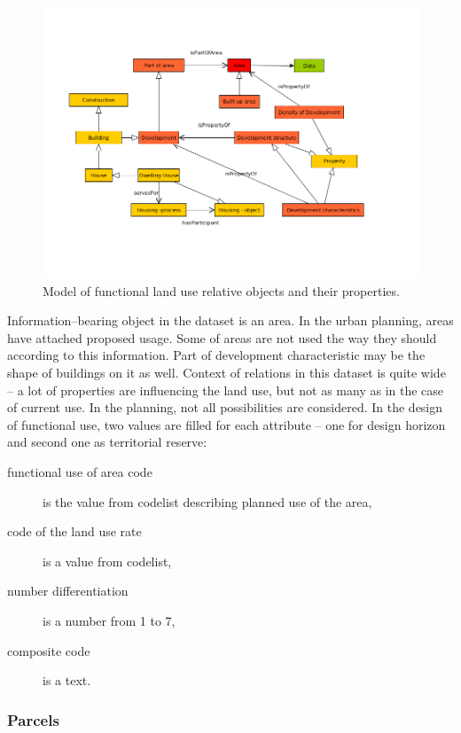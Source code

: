 \documentclass{lncs-template/llncs}
\begin{document}
\begin{figure}
 \includegraphics[width=1.0\textwidth]{images/FVU.png}
 \caption{Model of functional land use relative objects and their properties.}\label{fig:dat_fua}
\end{figure}

Information--bearing object in the dataset is an area. In the urban planning, areas have attached proposed usage. Some of areas are not used the way they should according to this information. Part of development characteristic may be the shape of buildings on it as well. Context of relations in this dataset is quite wide -- a lot of properties are influencing the land use, but not as many as in the case of current use. In the planning, not all possibilities are considered. In the design of functional use, two values are filled for each attribute -- one for design horizon and second one as territorial reserve:
\begin{description}
\item[functional use of area code] is the value from codelist describing planned use of the area,
\item[code of the land use rate] is a value from codelist,
\item[number differentiation] is a number from 1 to 7,
\item[composite code] is a text.
\end{description}

\subsubsection{Parcels}
\end{document}

